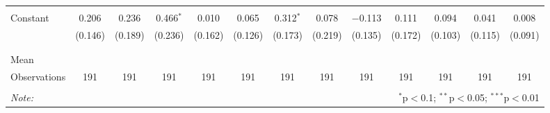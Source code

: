 \begin{tabular}{@{\extracolsep{5pt}}lcccccccccccc}
  & & & & & & & & & & & & \\ 
 Constant & 0.206 & 0.236 & 0.466$^{*}$ & 0.010 & 0.065 & 0.312$^{*}$ & 0.078 & $-$0.113 & 0.111 & 0.094 & 0.041 & 0.008 \\ 
  & (0.146) & (0.189) & (0.236) & (0.162) & (0.126) & (0.173) & (0.219) & (0.135) & (0.172) & (0.103) & (0.115) & (0.091) \\ 
  & & & & & & & & & & & & \\ 
\hline \\[-1.8ex] 
Mean &  &  &  &  &  &  &  &  &  &  &  &  \\ 
Observations & 191 & 191 & 191 & 191 & 191 & 191 & 191 & 191 & 191 & 191 & 191 & 191 \\ 
\hline 
\hline \\[-1.8ex] 
\textit{Note:}  & \multicolumn{12}{r}{$^{*}$p$<$0.1; $^{**}$p$<$0.05; $^{***}$p$<$0.01} \\ 
\end{tabular} 
